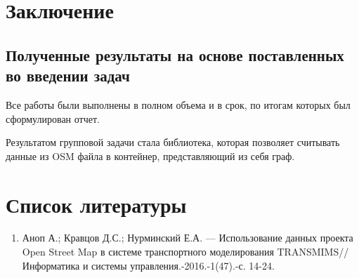 \chapter*{Заключение}
\section{Полученные результаты на основе поставленных во введении задач}
\noindent\indent Все работы были выполнены в полном объема и в срок,
по итогам которых был сформулирован отчет.
\par Результатом групповой задачи стала библиотека, которая позволяет считывать
данные из OSM файла в контейнер, представляющий из себя граф.

\chapter*{Список литературы}
\begin{enumerate}
  \item Аноп А.; Кравцов Д.С.; Нурминский Е.А. --- Использование данных проекта
  Open Street Map в системе транспортного моделирования TRANSMIMS// Информатика
  и системы управления.-2016.-1(47).-с. 14-24.
\end{enumerate}
